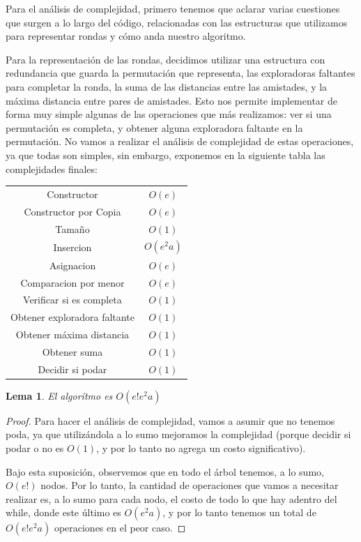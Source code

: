 \documentclass{article}
\newtheorem{lemma}{Lema}[theorem]
\theoremstyle{definition}
\theoremstyle{remark}
\begin{document}
Para el análisis de complejidad, primero tenemos que aclarar varias cuestiones que surgen a lo largo del código, relacionadas con las estructuras que utilizamos para representar rondas y cómo anda nuestro algoritmo.

Para la representación de las rondas, decidimos utilizar una estructura con redundancia que guarda la permutación que representa, las exploradoras faltantes para completar la ronda, la suma de las distancias entre las amistades, y la máxima distancia entre pares de amistades. Esto nos permite implementar de forma muy simple algunas de las operaciones que más realizamos: ver si una permutación es completa, y obtener alguna exploradora faltante en la permutación. No vamos a realizar el análisis de complejidad de estas operaciones, ya que todas son simples, sin embargo, exponemos en la siguiente tabla las complejidades finales:


\begin{tabular}{c|c}
 Constructor & $O(e)$ \\
 Constructor por Copia & $O(e)$ \\
 Tamaño & $O(1)$ \\
 Insercion & $O(e^2 a)$ \\
 Asignacion & $O(e)$ \\
 Comparacion por menor & $O(e)$ \\
 Verificar si es completa & $O(1)$ \\
 Obtener exploradora faltante & $O(1)$ \\
 Obtener máxima distancia & $O(1)$ \\
 Obtener suma & $O(1)$ \\
 Decidir si podar & $O(1)$ \\
\end{tabular}


\begin{lemma}
El algorítmo es $O(e! e^2 a)$
\end{lemma}

\begin{proof}
Para hacer el análisis de complejidad, vamos a asumir que no tenemos poda, ya que utilizándola a lo sumo mejoramos la complejidad (porque decidir si podar o no es $O(1)$, y por lo tanto no agrega un costo significativo).

Bajo esta suposición, observemos que en todo el árbol tenemos, a lo sumo, $O(e!)$ nodos. Por lo tanto, la cantidad de operaciones que vamos a necesitar realizar es, a lo sumo para cada nodo, el costo de todo lo que hay adentro del while, donde este último es $O(e^2 a)$, y por lo tanto tenemos un total de $O(e! e^2 a)$ operaciones en el peor caso.
\end{proof}
\end{document}

